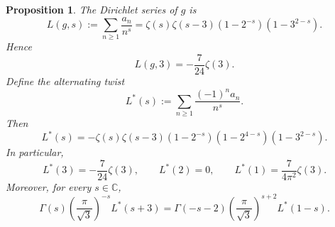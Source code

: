 \documentclass[10pt,a4paper]{amsart}
\newtheorem{proposition}{Proposition}
\newcommand{\C}{\mathbb{C}}
\begin{document}
\begin{proposition}\label{prop:Lfunctions}
The Dirichlet series of $g$ is
\begin{equation}\label{eq:Lg-factor}
L(g,s):=\sum_{n\ge 1}\frac{a_n}{n^s}=\zeta(s)\zeta(s-3)(1-2^{-s})(1-3^{2-s}).
\end{equation}
Hence
\begin{equation}\label{eq:Lg3}
L(g,3)=-\frac{7}{24}\zeta(3).
\end{equation}
Define the alternating twist
\begin{equation}\label{eq:Lstar-def}
L^*(s):=\sum_{n\ge 1}\frac{(-1)^n a_n}{n^s}.
\end{equation}
Then
\begin{equation}\label{eq:Lstar-factor}
L^*(s)=-\zeta(s)\zeta(s-3)(1-2^{-s})(1-2^{4-s})(1-3^{2-s}).
\end{equation}
In particular,
\begin{equation}\label{eq:Lstar-specials}
L^*(3)=-\frac{7}{24}\zeta(3),
\qquad
L^*(2)=0,
\qquad
L^*(1)=\frac{7}{4\pi^2}\zeta(3).
\end{equation}
Moreover, for every $s\in\C$,
\begin{equation}\label{eq:Lstar-fe}
\Gamma(s)\left(\frac{\pi}{\sqrt 3}\right)^{-s}L^*(s+3)
=
\Gamma(-s-2)\left(\frac{\pi}{\sqrt 3}\right)^{s+2}L^*(1-s).
\end{equation}
\end{proposition}
\end{document}
